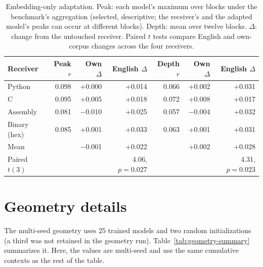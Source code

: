 \documentclass[mlmain]{jmlr}
\begin{document}
\begin{table}[htbp]
  \centering
  \caption{Embedding-only adaptation. Peak: each model's maximum over blocks under the benchmark's aggregation (selected, descriptive; the receiver's and the adapted model's peaks can occur at different blocks). Depth: mean over twelve blocks. $\Delta$: change from the untouched receiver. Paired $t$ tests compare English and own-corpus changes across the four receivers.}
  \label{tab:embed-adapt}
  \small
  \setlength{\tabcolsep}{4pt}
  \begin{tabular}{lrrrrrr}
\toprule
Receiver & Peak $r$ & Own $\Delta$ & English $\Delta$ & Depth $r$ & Own $\Delta$ & English $\Delta$ \\
\midrule
Python & 0.098 & +0.000 & +0.014 & 0.066 & +0.002 & +0.031 \\
C & 0.095 & +0.005 & +0.018 & 0.072 & +0.008 & +0.017 \\
Assembly & 0.081 & $-$0.010 & +0.025 & 0.057 & $-$0.004 & +0.032 \\
Binary (hex) & 0.085 & +0.001 & +0.033 & 0.063 & +0.001 & +0.031 \\
\addlinespace
Mean &  & $-$0.001 & +0.022 &  & +0.002 & +0.028 \\
Paired $t(3)$ &  &  & 4.06, $p=0.027$ &  &  & 4.31, $p=0.023$ \\
\bottomrule
\end{tabular}
\end{table}

\section{Geometry details}
\label{app:geometry}

The multi-seed geometry uses 25 trained models and two random initializations (a third was not retained in the geometry run). Table~\ref{tab:geometry-summary} summarizes it.  Here, the values are multi-seed and use the same cumulative contexts as the rest of the table.
\end{document}
